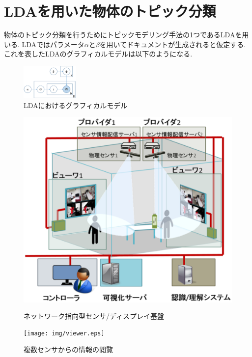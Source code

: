 \section{LDAを用いた物体のトピック分類}
物体のトピック分類を行うためにトピックモデリング手法の1つであるLDA\cite{lda}を用いる.
LDAではパラメータ$\alpha$と$\beta$を用いてドキュメントが生成されると仮定する.
これを表したLDAのグラフィカルモデルは以下のようになる.
\begin{figure}[h!]
	\begin{center}
		\includegraphics[width=0.25\textwidth,clip]{img/graphicalmodel.eps}
	\end{center}
	\caption{LDAにおけるグラフィカルモデル}
	\label{fig:graphical_model}
\end{figure} 
\begin{figure}[h!]
	\begin{minipage}[b]{0.5\linewidth}
		\includegraphics[width=\textwidth,clip]{img/infra.eps}
		\caption{ネットワーク指向型センサ/ディスプレイ基盤}
		\label{fig:infra}
        \end{minipage}%
	\begin{minipage}[b]{0.5\linewidth}
		\texttt{[image: img/viewer.eps]}
		\caption{複数センサからの情報の閲覧}
		\label{fig:infra}
        \end{minipage}
\end{figure}

